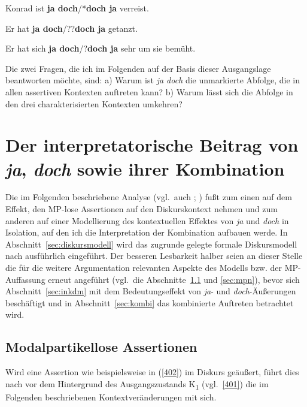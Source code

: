 \begin{exe}
	\ex\label{398} 
	Konrad ist \textbf{ja doch}/*\textbf{doch ja} verreist.
	\hfill\hbox{\citet[114]{Doherty1987}}
\end{exe}
\begin{exe}
	\ex\label{399} 
	Er hat \textbf{ja doch}/??\textbf{doch ja} getanzt.
	\hfill\hbox{\citet[20]{Struckmeier2014}}
\end{exe}
\begin{exe}
	\ex\label{400} 
	Er hat sich \textbf{ja doch}/?\textbf{doch ja} sehr um sie bemüht.
	\hfill\hbox{\citet[157]{Jacobs1991}}
\end{exe}
Die zwei Fragen, die ich im Folgenden auf der Basis dieser Ausgangslage beantworten möchte, sind: a) Warum ist \textit{ja doch} die unmarkierte Abfolge, die in allen assertiven Kontexten auftreten kann? b) Warum lässt sich die Abfolge in den drei charakterisierten Kontexten umkehren?
	
\section{Der interpretatorische Beitrag von \textit{ja}, \textit{doch} sowie ihrer Kombination}		
\label{sec:interpretationjd}			
Die im Folgenden beschriebene Analyse (vgl.\ auch \citealt[183--197]{Mueller2014a}; \citeyear[214--223]{Mueller2017b}) fußt zum einen auf dem Effekt, den MP-lose Assertionen auf den Diskurskontext nehmen und zum anderen auf einer Modellierung des kontextuellen Effektes von \textit{ja} und \textit{doch} in Isolation, auf den ich die Interpretation der Kombination aufbauen werde. In Abschnitt~\ref{sec:diskursmodell} wird das zugrunde gelegte formale Diskursmodell nach \citet{Farkas2010} ausführlich eingeführt. Der besseren Lesbarkeit halber seien an dieser Stelle die für die weitere Argumentation relevanten Aspekte des Modells bzw. der MP-Auffassung erneut angeführt (vgl.\ die Abschnitte~\ref{sec:mplass} und \ref{sec:mpn}), bevor sich Abschnitt~\ref{sec:inkdm} mit dem Bedeutungseffekt von \textit{ja}- und \textit{doch}-Äußerungen beschäftigt und in Abschnitt~\ref{sec:kombi} das kombinierte Auftreten betrachtet wird.
								
\subsection{Modalpartikellose Assertionen}
\label{sec:mplass}
Wird eine Assertion wie beispielsweise in (\ref{402}) im Diskurs geäußert, führt dies nach \citet{Farkas2010} vor dem Hintergrund des Ausgangszustands K\textsubscript{1} (vgl.\ \ref{401}) die im Folgenden beschriebenen Kontextveränderungen mit sich.
     
